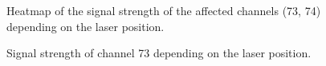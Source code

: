 \begin{figure}[H]
	\centering
	\caption{Heatmap of the signal strength of the affected channels (73, 74) depending on the laser position.}
	\label{fig:smallheat}
\end{figure}

\begin{figure}[H]
	\centering
	\caption{Signal strength of channel 73 depending on the laser position.}
	\label{fig:73}
\end{figure}

